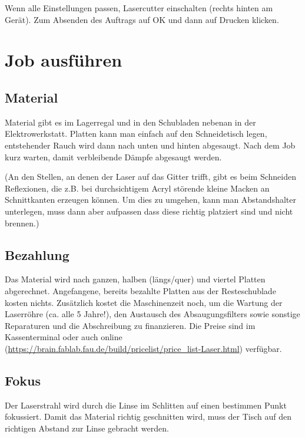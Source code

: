 \documentclass{\basedir/fablab-document}
\begin{document}


	Wenn alle Einstellungen passen, Lasercutter einschalten (rechts hinten am Gerät). Zum Absenden des Auftrags auf OK und dann auf Drucken klicken.

	\section{Job ausführen}

	\subsection{Material}
	Material gibt es im Lagerregal und in den Schubladen nebenan in der Elektrowerkstatt. Platten kann man einfach auf den Schneidetisch legen, entstehender Rauch wird dann nach unten und hinten abgesaugt. Nach dem Job kurz warten, damit verbleibende Dämpfe abgesaugt werden.

	(An den Stellen, an denen der Laser auf das Gitter trifft, gibt es beim Schneiden Reflexionen, die z.B. bei durchsichtigem Acryl störende kleine Macken an Schnittkanten erzeugen können. Um dies zu umgehen, kann man Abstandshalter unterlegen, muss dann aber aufpassen dass diese richtig platziert sind und nicht brennen.)

	\subsection{Bezahlung}
	\label{sec:bezahlung}
	Das Material wird nach ganzen, halben (längs/quer) und viertel Platten abgerechnet. Angefangene, bereits bezahlte Platten aus der Resteschublade kosten nichts. Zusätzlich kostet die Maschinen\-zeit noch, um die Wartung der Laser\-röhre (ca.  alle 5 Jahre!), den Austausch des Absaugungsfilters sowie sonstige Reparaturen und die Abschreibung zu finan\-zieren.
	Die Preise sind im Kassenterminal oder auch online (\url{https://brain.fablab.fau.de/build/pricelist/price_list-Laser.html}) verfügbar.

	\subsection{Fokus} \label{fokus}
	Der Laserstrahl wird durch die Linse im Schlitten auf einen bestimmen Punkt fokussiert. Damit das Material richtig geschnitten wird, muss der Tisch auf den richtigen Abstand zur Linse gebracht werden.
\end{document}
